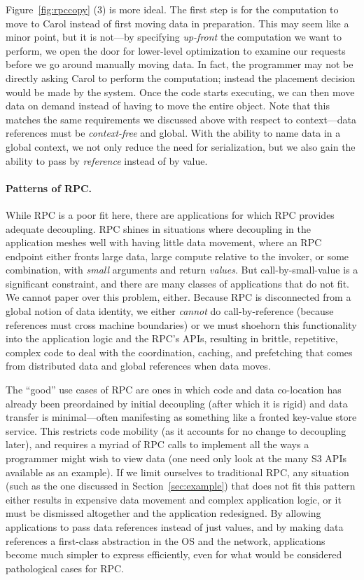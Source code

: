 Figure~\ref{fig:rpccopy} (3) is more ideal. The first step is for
the computation to move to Carol instead of first moving data in preparation.  This may seem like a
minor point, but it is not---by specifying \emph{up-front} the computation we want to perform, we
open the door for lower-level optimization to examine our requests before we go around manually
moving data.  In fact, the programmer may not be directly asking Carol to perform the
computation; instead the placement decision would be made by the system. Once the code starts
executing, we can then move data on demand instead of having to move the entire
object.
Note that this matches the same requirements we discussed above with respect to context---data references must
be \emph{context-free} and global. With the ability to name data in a global context, we not only reduce the need for
serialization, but we also gain the ability to pass by \emph{reference} instead of by value.


\paragraph*{Patterns of RPC.}
%
While RPC is a poor fit here, there are applications for which RPC provides adequate decoupling.
RPC shines in situations where decoupling in the application meshes well with having little data
movement, where an RPC endpoint either fronts large data, large compute relative to the invoker, or
some combination, with \emph{small} arguments and return \emph{values}.
But call-by-small-value is a significant constraint, and there are many
classes of applications that do not fit.
We cannot paper over this problem, either.
Because
RPC is disconnected from a global notion of data identity, we either \emph{cannot} do
call-by-reference (because references must cross machine boundaries) or we must shoehorn this
functionality into the application logic and the RPC's APIs, resulting in brittle, repetitive,
complex code to deal with the coordination, caching, and prefetching that
comes from distributed data and global references when data moves.

The ``good'' use cases of RPC are ones in which code and data
co-location has already been preordained by initial decoupling (after which it is rigid) and
data transfer is minimal---often manifesting as something like a fronted key-value store service. This restricts
code mobility (as it accounts for no change to decoupling later), and requires a myriad of RPC calls
to implement all the ways a programmer might wish to view data (one need only look at the many S3
APIs available as an example).
If we limit ourselves to traditional RPC, any situation (such as the one discussed in
Section~\ref{sec:example}) that does not fit this pattern either results in expensive data movement
and complex application logic, or it must be dismissed altogether and the application redesigned.
By allowing applications to pass data references instead of just values, and by making data
references a first-class abstraction in the OS and the network, applications become much simpler to
express efficiently, even for what would be considered pathological cases for RPC.

